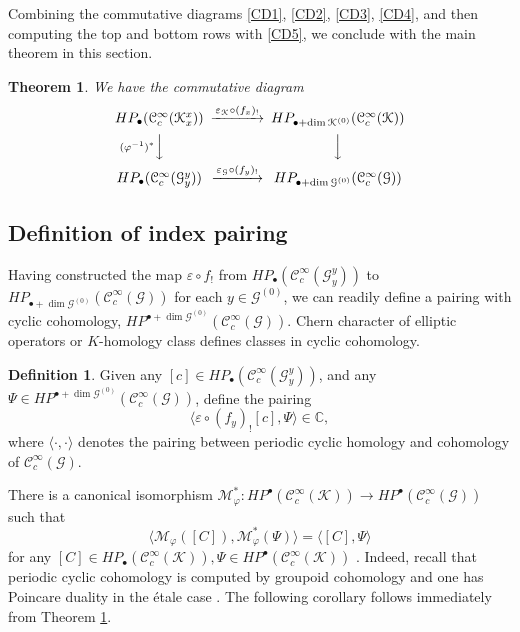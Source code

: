 \documentclass[a4paper]{amsart}
\newcommand{\CC}{\mathbb C}
\newcommand{\maC}{\mathcal C}
\newcommand{\maG}{\mathcal G}
\newcommand{\maK}{\mathcal K}
\newcommand{\maM}{\mathcal M}
\newcommand\<{\langle}
\renewcommand\>{\rangle}
\newtheorem{thm}[theorem]{Theorem}
\theoremstyle{definition}
\newtheorem{dfn}[theorem]{Definition}
\theoremstyle{remark}
\begin{document}
Combining the commutative diagrams \eqref{CD1}, \eqref{CD2}, \eqref{CD3}, \eqref{CD4},
and then computing the top and bottom rows with \eqref{CD5}, we conclude with the main theorem in this section.

\begin{thm}
\label{CD6}
We have the commutative diagram
$$
\begin{CD}
H P _\bullet (\maC^\infty _c (\maK ^x _x))
@>{\varepsilon _\maK \circ (f _x)_!}>> H P _{\bullet + \dim \maK ^{(0)}} (\maC^\infty _c (\maK)) \\
@V{(\varphi ^{-1})^*}VV @VVV \\
H P _\bullet (\maC^\infty _c (\maG ^y _y))
@>{\varepsilon _\maG \circ (f _y)_!}>> H P _{\bullet + \dim \maG ^{(0)}} (\maC^\infty _c (\maG))
\end{CD}
$$
\end{thm}


\subsection{Definition of index pairing}
Having constructed the map $\varepsilon \circ f_!$ from
$H P _\bullet (\maC^\infty _c (\maG ^y _y))$ to
$H P _{\bullet + \dim \maG ^{(0)}} (\maC^\infty _c (\maG))$ for each $y \in \maG ^{(0)}$,
we can readily define a pairing with cyclic cohomology,
$H P ^{\bullet + \dim \maG ^{(0)}}  (\maC^\infty _c (\maG))$.
Chern character of elliptic operators or $K$-homology class defines classes in cyclic cohomology.

\begin{dfn}
Given any $[c] \in H P _\bullet (\maC^\infty _c (\maG ^y _y))$,
and any $\Psi \in H P ^{\bullet + \dim \maG ^{(0)}} (\maC^\infty _c (\maG))$,
define the pairing
$$ \langle \varepsilon \circ (f _y)_! [c] , \Psi \rangle \in \CC,$$
where $\langle \cdot , \cdot \rangle $ denotes the pairing between periodic cyclic homology and cohomology of $\maC^\infty _c (\maG)$.
\end{dfn}

There is a canonical isomorphism $\maM _\varphi ^* : H P ^\bullet (\maC^\infty _c (\maK)) \to H P ^\bullet (\maC^\infty _c (\maG)) $
such that
$$ \langle \maM _\varphi ([C]) , \maM _\varphi ^* (\Psi) \rangle = \langle [C], \Psi \rangle $$
for any $[C] \in H P _\bullet (\maC^\infty _c (\maK)), \Psi \in H P ^\bullet (\maC^\infty _c (\maK)) $
\cite[Theorem 4.12]{Crainic;EtaleGpoid}.
Indeed, recall that periodic cyclic cohomology is computed by groupoid cohomology and one has Poincare duality in the \'etale case
\cite{Moerdijk;EtaleHomology, Behrend;CohStack}.
The following corollary follows immediately from Theorem \ref{CD6}.
\end{document}
